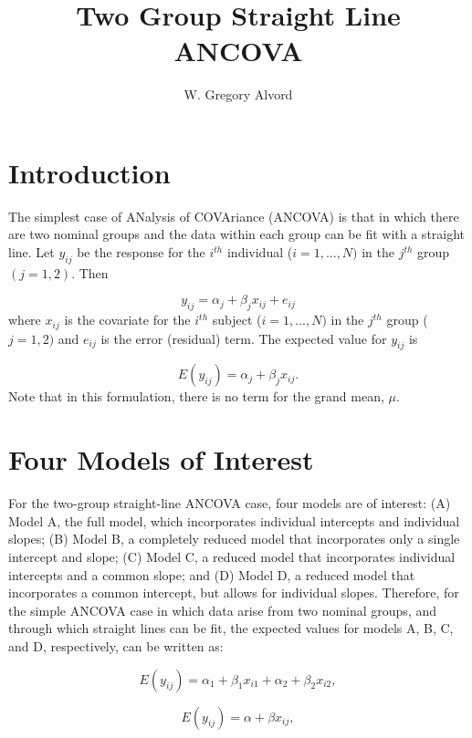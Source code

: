 \documentclass[11pt, oneside]{article}   	%
\title{Two Group Straight Line ANCOVA}
\author{W. Gregory Alvord}
\date{}							%
\begin{document}
\maketitle
\section{Introduction}
The simplest case of ANalysis of COVAriance (ANCOVA) is that in which there are two nominal groups and the data within each group can be fit with a straight line.  Let $ y_{ij} $ be the response for the $ i^{th} $ individual ($i = 1, ..., N) $ in the $ j^{th} $  group $(j = 1, 2) $.  Then

\begin{equation}
y_{ij} = \alpha_{j} + \beta_{j} x_{ij} + e_{ij} 
\end{equation}
where $ x_{ij} $ is the covariate for the $i^{th} $ subject ($i = 1, ..., N) $ in the $j^{th} $ group ($j = 1, 2) $ and $e_{ij} $ is the error (residual) term.  The expected value for $y_{ij} $ is 

\begin{equation}
E(y_{ij}) = \alpha_{j} + \beta_{j} x_{ij}. 
\end{equation}
Note that in this formulation, there is no term for the grand mean, $\mu$. 
\bigskip

\section{Four Models of Interest}
For the two-group straight-line ANCOVA case, four models are of interest:  (A) Model A, the full model, which incorporates individual intercepts and individual slopes; (B) Model B, a completely reduced model that incorporates only a single intercept and slope; (C) Model C, a reduced model that incorporates individual intercepts and a common slope; and (D) Model D, a reduced model that incorporates a common intercept, but allows for individual slopes.  Therefore, for the simple ANCOVA case in which data arise from two nominal groups, and through which straight lines can be fit, the expected values for models A, B, C, and D, respectively, can be written as: 

\begin{equation}
E(y_{ij}) = \alpha_{1} + \beta_{1} x_{i1} + \alpha_{2} + \beta_{2} x_{i2},  
\end{equation}
   
\begin{equation}
E(y_{ij}) = \alpha + \beta x_{ij},
\end{equation}
\end{document}
